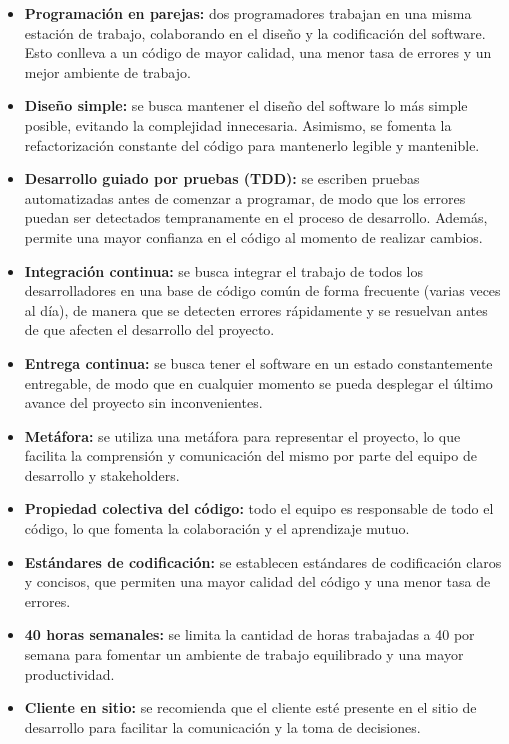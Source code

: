 \documentclass[executivepaper]{article}
\begin{document}
\begin{itemize}
\item \textbf{Programación en parejas:} dos programadores trabajan en una misma estación de trabajo, colaborando en el diseño y la codificación del software. Esto conlleva a un código de mayor calidad, una menor tasa de errores y un mejor ambiente de trabajo.
\item \textbf{Diseño simple:} se busca mantener el diseño del software lo más simple posible, evitando la complejidad innecesaria. Asimismo, se fomenta la refactorización constante del código para mantenerlo legible y mantenible.
\item \textbf{Desarrollo guiado por pruebas (TDD):} se escriben pruebas automatizadas antes de comenzar a programar, de modo que los errores puedan ser detectados tempranamente en el proceso de desarrollo. Además, permite una mayor confianza en el código al momento de realizar cambios.
\item \textbf{Integración continua:} se busca integrar el trabajo de todos los desarrolladores en una base de código común de forma frecuente (varias veces al día), de manera que se detecten errores rápidamente y se resuelvan antes de que afecten el desarrollo del proyecto.
\item \textbf{Entrega continua:} se busca tener el software en un estado constantemente entregable, de modo que en cualquier momento se pueda desplegar el último avance del proyecto sin inconvenientes.
\item \textbf{Metáfora:} se utiliza una metáfora para representar el proyecto, lo que facilita la comprensión y comunicación del mismo por parte del equipo de desarrollo y stakeholders.
\item \textbf{Propiedad colectiva del código:} todo el equipo es responsable de todo el código, lo que fomenta la colaboración y el aprendizaje mutuo.
\item \textbf{Estándares de codificación:} se establecen estándares de codificación claros y concisos, que permiten una mayor calidad del código y una menor tasa de errores.
\item \textbf{40 horas semanales:} se limita la cantidad de horas trabajadas a 40 por semana para fomentar un ambiente de trabajo equilibrado y una mayor productividad.
\item \textbf{Cliente en sitio:} se recomienda que el cliente esté presente en el sitio de desarrollo para facilitar la comunicación y la toma de decisiones.
\end{itemize}
\end{document}
